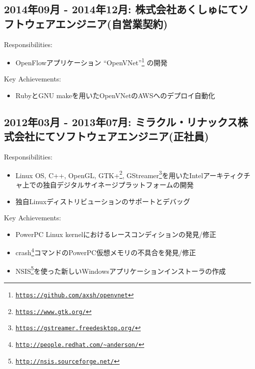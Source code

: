 \documentclass[letterpaper]{article}
\begin{document}
\subsection*{2014年09月 - 2014年12月: 株式会社あくしゅにてソフトウェアエンジニア(自営業契約)}

\noindent Responsibilities:

\begin{itemize}
  \item OpenFlowアプリケーション ``OpenVNet''\footnote{\href{https://github.com/axsh/openvnet}{\tt https://github.com/axsh/openvnet}} の開発
\end{itemize}

\noindent Key Achievements:

\begin{itemize}
  \item RubyとGNU makeを用いたOpenVNetのAWSへのデプロイ自動化
\end{itemize}

\subsection*{2012年03月 - 2013年07月: ミラクル・リナックス株式会社にてソフトウェアエンジニア(正社員)}

\noindent Responsibilities:

\begin{itemize}
  \item Linux OS, C++, OpenGL, GTK+\footnote{\href{https://www.gtk.org/}{\tt https://www.gtk.org/}}, GStreamer\footnote{\href{https://gstreamer.freedesktop.org/}{\tt https://gstreamer.freedesktop.org/}}を用いたIntelアーキティクチャ上での独自デジタルサイネージプラットフォームの開発
  \item 独自Linuxディストリビューションのサポートとデバッグ
\end{itemize}

\noindent Key Achievements:

\begin{itemize}
  \item PowerPC Linux kernelにおけるレースコンディションの発見/修正
  \item crash\footnote{\href{http://people.redhat.com/{\textasciitilde}anderson/}{\tt http://people.redhat.com/{\textasciitilde}anderson/}}コマンドのPowerPC仮想メモリの不具合を発見/修正
  \item NSIS\footnote{\href{http://nsis.sourceforge.net/}{\tt http://nsis.sourceforge.net/}}を使った新しいWindowsアプリケーションインストーラの作成
\end{itemize}
\end{document}
